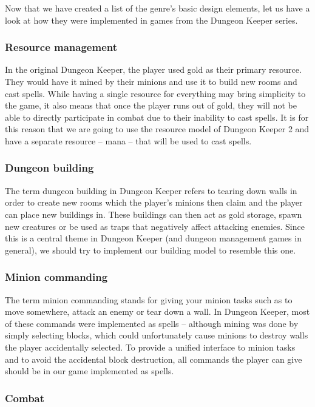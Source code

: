 Now that we have created a list of the genre's basic design elements, let us have a look at how they were implemented in games from the
Dungeon Keeper series.

\subsubsection{Resource management}

In the original Dungeon Keeper, the player used gold as their primary resource. They would have it mined by their minions and use
it to build new rooms and cast spells. While having a single resource for everything may bring simplicity to the game, it also means
that once the player runs out of gold, they will not be able to directly participate in combat due to their inability to cast spells.
It is for this reason that we are going to use the resource model of Dungeon Keeper 2 and have a separate resource -- mana -- that
will be used to cast spells.


\subsubsection{Dungeon building}

The term dungeon building in Dungeon Keeper refers to tearing down walls in order to create new rooms which the player's minions 
then claim and the player can place new buildings in. These buildings can then act as gold storage, spawn new creatures or be used
as traps that negatively affect attacking enemies. Since this is a central theme in Dungeon Keeper (and dungeon management games
in general), we should try to implement our building model to resemble this one.

\subsubsection{Minion commanding}

The term minion commanding stands for giving your minion tasks such as to move somewhere, attack an enemy or tear down a wall. In
Dungeon Keeper, most of these commands were implemented as spells -- although mining was done by simply selecting blocks, which
could unfortunately cause minions to destroy walls the player accidentally selected. To provide a unified interface to minion tasks
and to avoid the accidental block destruction, all commands the player can give should be in our game implemented as spells.


\subsubsection{Combat}

